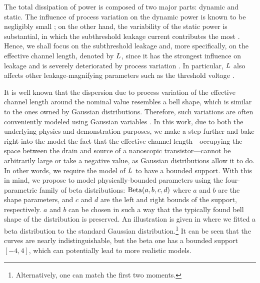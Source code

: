 The total dissipation of power is composed of two major parts: dynamic and static.
The influence of process variation on the dynamic power is known to be negligibly small \cite{srivastava2010, juan2011, juan2012}; on the other hand, the variability of the static power is substantial, in which the subthreshold leakage current contributes the most \cite{juan2011, juan2012}.
Hence, we shall focus on the subthreshold leakage and, more specifically, on the effective channel length, denoted by $L$, since it has the strongest influence on leakage and is severely deteriorated by process variation \cite{chandrakasan2001}.
In particular, $L$ also affects other leakage-magnifying parameters such as the threshold voltage \cite{juan2011}.

It is well known that the dispersion due to process variation of the effective channel length around the nominal value resembles a bell shape, which is similar to the ones owned by Gaussian distributions.
Therefore, such variations are often conveniently modeled using Gaussian variables \cite{srivastava2010, juan2011, juan2012, chandra2010, huang2009, lee2013, shen2009, bhardwaj2006, ghanta2006}.
In this work, due to both the underlying physics and demonstration purposes, we make a step further and bake right into the model the fact that the effective channel length---occupying the space between the drain and source of a nanoscopic transistor---cannot be arbitrarily large or take a negative value, as Gaussian distributions allow it to do.
In other words, we require the model of $L$ to have a bounded support.
With this in mind, we propose to model physically-bounded parameters using the four-parametric family of beta distributions: $\text{Beta}(a, b, c, d)$ where $a$ and $b$ are the shape parameters, and $c$ and $d$ are the left and right bounds of the support, respectively.
$a$ and $b$ can be chosen in such a way that the typically found bell shape of the distribution is preserved.
An illustration is given in  where we fitted a beta distribution to the standard Gaussian distribution.\footnote{Alternatively, one can match the first two moments.}
It can be seen that the curves are nearly indistinguishable, but the beta one has a bounded support $[-4, 4]$, which can potentially lead to more realistic models.

